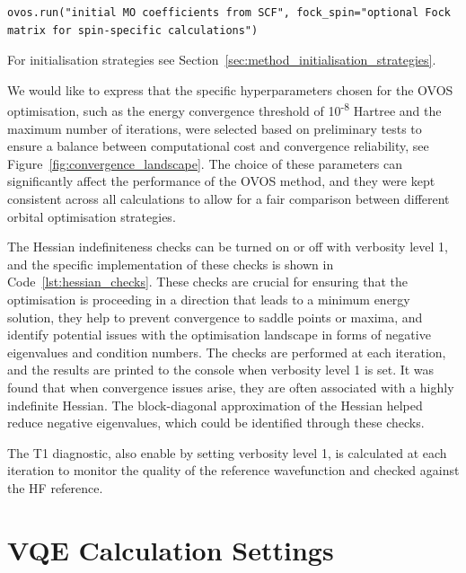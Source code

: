 \begin{lstlisting}[style=python, caption={OVOS.run()}, label=lst:run_init]
ovos.run("initial MO coefficients from SCF", fock_spin="optional Fock matrix for spin-specific calculations")
\end{lstlisting}

For initialisation strategies see Section~\ref{sec:method_initialisation_strategies}. 

We would like to express that the specific hyperparameters chosen for the OVOS optimisation, such as the energy convergence threshold of 10\textsuperscript{-8} Hartree and the maximum number of iterations, were selected based on preliminary tests to ensure a balance between computational cost and convergence reliability, see Figure~\ref{fig:convergence_landscape}. The choice of these parameters can significantly affect the performance of the OVOS method, and they were kept consistent across all calculations to allow for a fair comparison between different orbital optimisation strategies.

The Hessian indefiniteness checks can be turned on or off with verbosity level 1, and the specific implementation of these checks is shown in Code~\ref{lst:hessian_checks}. These checks are crucial for ensuring that the optimisation is proceeding in a direction that leads to a minimum energy solution, they help to prevent convergence to saddle points or maxima, and identify potential issues with the optimisation landscape in forms of negative eigenvalues and condition numbers. The checks are performed at each iteration, and the results are printed to the console when verbosity level 1 is set. It was found that when convergence issues arise, they are often associated with a highly indefinite Hessian. The block-diagonal approximation of the Hessian helped reduce negative eigenvalues, which could be identified through these checks.

The T1 diagnostic, also enable by setting verbosity level 1, is calculated at each iteration to monitor the quality of the reference wavefunction and checked against the HF reference.

\section{VQE Calculation Settings}
\label{sec:comp_calc_set_vqe}

